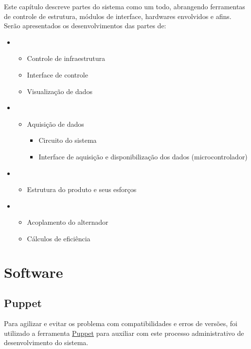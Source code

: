 Este capítulo descreve partes do sistema como um todo, abrangendo ferramentas de controle de estrutura, módulos de interface, hardwares envolvidos e afins. Serão apresentados os desenvolvimentos das partes de:

\begin{itemize}
	\item {}
	\begin{itemize}
		\item Controle de infraestrutura
		\item Interface de controle
		\item Visualização de dados
	\end{itemize}
	\item {}
	\begin{itemize}
		\item Aquisição de dados
		\begin{itemize}
			\item Circuito do sistema
			\item Interface de aquisição e disponibilização dos dados (microcontrolador)
		\end{itemize}
	\end{itemize}
	\item {}
	\begin{itemize}
		\item Estrutura do produto e seus esforços
	\end{itemize}
	\item {}
	\begin{itemize}
		\item Acoplamento do alternador
		\item Cálculos de eficiência
	\end{itemize}
\end{itemize}


\chapter{Software}
\label{software}

\section{Puppet} %
\label{sec:puppet}

Para agilizar e evitar os problema com compatibilidades e erros de versões, foi utilizado a ferramenta \href{http://puppetlabs.com}{Puppet} para auxiliar com este processo administrativo de desenvolvimento do sistema.

